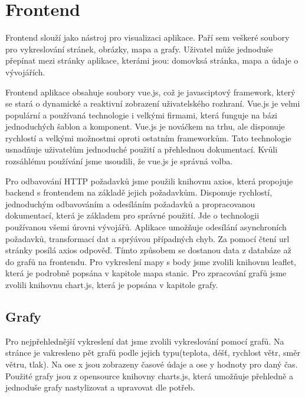 \section{Frontend}
Frontend slouží jako nástroj pro visualizaci aplikace. Paří sem veškeré soubory pro vykreslování stránek, obrázky, mapa a grafy. Uživatel může jednoduše přepínat mezi stránky aplikace, kterámi jsou: domovksá stránka, mapa a údaje o vývojářích.

Frontend aplikace obsahuje soubory vue.js, což je javasciptový framework, který se stará o dynamické a reaktivní zobrazení uživatelského rozhraní. Vue.js je velmi populární a používaná technologie i velkými firmami, která funguje na bázi jednoduchých šablon a komponent.
Vue.js je nováčkem na trhu, ale disponuje rychlostí a velkými možnostmi oproti ostatním frameworkům.
Tato technologie usnadňuje uživatelům jednoduché použití a přehlednou dokumentací. Kvůli rozsáhlému používání jsme usoudili, že vue.js je správná volba. 

Pro odbavování HTTP požadavků jsme použili knihovnu axios, která propojuje backend s frontendem na základě jejich požadavkům. Disponuje rychlostí, jednoduchým odbavováním a odesíláním požadavků a propracovanou dokumentací, která je základem pro správné použití.
Jde o technologii používanou všemi úrovni vývojářů. Aplikace umožňuje odesílání asynchroních požadavků, transformací dat a sprýávou případných chyb.
Za pomocí čtení url stránky posílá axios odpověď. Tímto způsobem se dostanou data z databáze až do grafů na frontendu. 
Pro vykreslení mapy s body jsme zvolili knihovnu leaflet, která je podrobně popsána v kapitole mapa stanic. Pro zpracování grafů jsme zvolili knihovnu chart.js, která je popsána v kapitole grafy.

\subsection{Grafy}
Pro nejpřehlednější vykreslení dat jsme zvolili vykreslování pomocí grafů. Na stránce je vakresleno pět grafů podle jejich typu(teplota, déšť, rychlost větr, směr větru, tlak). %
Na ose x jsou zobrazeny časové údaje a ose y hodnoty pro daný čas. Použité grafy jsou z opensource knihovny charts.js, která umožňuje přehledně a jednoduše grafy nastylizovat a upravovat dle potřeb.

